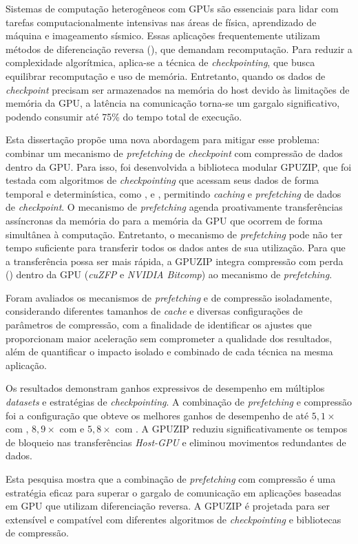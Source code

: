 \documentclass[Ingles,Final]{ic-tese-v3}
\begin{document}
\begin{resumo}
Sistemas de computação heterogêneos com GPUs são essenciais para lidar com tarefas computacionalmente intensivas nas áreas de física, aprendizado de máquina e imageamento sísmico. Essas aplicações frequentemente utilizam métodos de diferenciação reversa (), que demandam recomputação. Para reduzir a complexidade algorítmica, aplica-se a técnica de \textit{checkpointing}, que busca equilibrar recomputação e uso de memória. Entretanto, quando os dados de \textit{checkpoint} precisam ser armazenados na memória do host devido às limitações de memória da GPU, a latência na comunicação torna-se um gargalo significativo, podendo consumir até 75\% do tempo total de execução.

Esta dissertação propõe uma nova abordagem para mitigar esse problema: combinar um mecanismo de \textit{prefetching} de \textit{checkpoint} com compressão de dados dentro da GPU. Para isso, foi desenvolvida a biblioteca modular GPUZIP, que foi testada com algoritmos de \textit{checkpointing} que acessam seus dados de forma temporal e determinística, como \revolve, \zcut e \uniform, permitindo \textit{caching} e \textit{prefetching} de dados de \textit{checkpoint}. O mecanismo de \textit{prefetching} agenda proativamente transferências assíncronas da memória do  para a memória da GPU que ocorrem de forma simultânea à computação. Entretanto, o mecanismo de \textit{prefetching} pode não ter tempo suficiente para transferir todos os dados antes de sua utilização. Para que a transferência possa ser mais rápida, a GPUZIP integra compressão com perda () dentro da GPU (\textit{cuZFP} e \textit{NVIDIA Bitcomp}) ao mecanismo de \textit{prefetching}.

Foram avaliados os mecanismos de \textit{prefetching} e de compressão isoladamente, considerando diferentes tamanhos de \textit{cache} e diversas configurações de parâmetros de compressão, com a finalidade de identificar os ajustes que proporcionam maior aceleração sem comprometer a qualidade dos resultados, além de quantificar o impacto isolado e combinado de cada técnica na mesma aplicação.

Os resultados demonstram ganhos expressivos de desempenho em múltiplos \textit{datasets} e estratégias de \textit{checkpointing}. A combinação de \textit{prefetching} e compressão foi a configuração que obteve os melhores ganhos de desempenho de até $5,1\times$ com \revolve, $8,9\times$ com \zcut e $5,8\times$ com \uniform. A GPUZIP reduziu significativamente os tempos de bloqueio nas transferências \textit{Host-GPU} e eliminou movimentos redundantes de dados.

Esta pesquisa mostra que a combinação de \textit{prefetching} com compressão é uma estratégia eficaz para superar o gargalo de comunicação em aplicações baseadas em GPU que utilizam diferenciação reversa. A GPUZIP é projetada para ser extensível e compatível com diferentes algoritmos de \textit{checkpointing} e bibliotecas de compressão.




\end{resumo}
\end{document}
